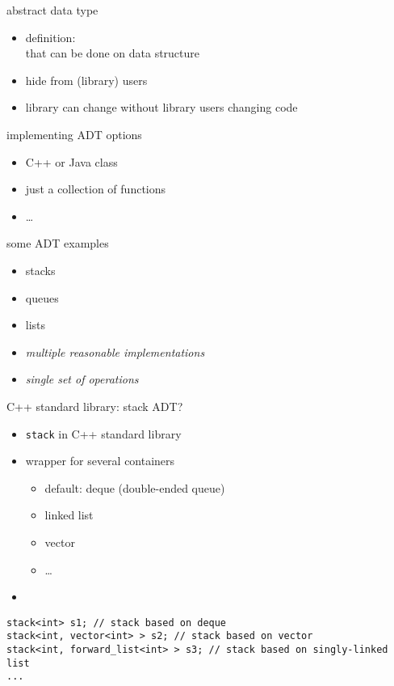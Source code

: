 \begin{frame}{abstract data type}
\begin{itemize}
\item definition:  \\
      that can be done on data structure
\vspace{.5cm}
\item<2-> hide  from (library) users
\item<2-> library can change without library users changing code
\end{itemize}
\end{frame}


\begin{frame}{implementing ADT options}
    \begin{itemize}
    \item C++ or Java class
    \item just a collection of functions
    \item \ldots
    \end{itemize}
\end{frame}

\begin{frame}{some ADT examples}
    \begin{itemize}
        \item stacks
        \item queues
        \item lists
            \vspace{.5cm}
        \item \textit{multiple reasonable implementations}
        \item \textit{single set of operations}
    \end{itemize}
\end{frame}

\begin{frame}[fragile,label=stackAdt]{C++ standard library: stack ADT?}
\lstset{
    language=C++,
    style=small
}
\begin{itemize}
\item \texttt{stack} in C++ standard library
\item wrapper for several containers
    \begin{itemize}
    \item default: deque (double-ended queue)
    \item linked list
    \item vector
    \item \ldots
    \end{itemize}
\item {}
\end{itemize}
\begin{lstlisting}
stack<int> s1; // stack based on deque
stack<int, vector<int> > s2; // stack based on vector
stack<int, forward_list<int> > s3; // stack based on singly-linked list
...
\end{lstlisting}
\end{frame}

